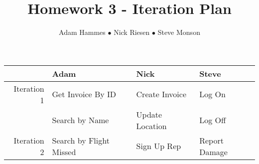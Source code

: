 \documentclass[12pt]{article}
\title{\vspace{.5in}Homework 3 - Iteration Plan}
\author{Adam Hammes $\bullet$ Nick Riesen $\bullet$ Steve Monson}
\begin{document}
\maketitle

\begin{center}
\begin{tabular}{| r | l | l | l |}
    \hline             & Adam                       & Nick                 & Steve \\
    \hline Iteration 1 & Get Invoice By ID          & Create Invoice       & Log On \\
                       & Search by Name             & Update Location      & Log Off \\
    \hline Iteration 2 & Search by Flight Missed    & Sign Up Rep          & Report Damage \\
                     
    \hline
\end{tabular}
\end{center}
\end{document}

